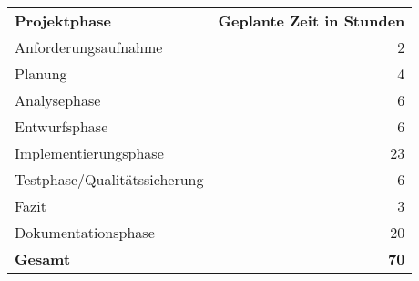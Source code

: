 \begin{tabu}{lr}
	\rowfont{\bfseries\leavevmode\color{headingfont}}\textbf{Projektphase} & \textbf{Geplante Zeit in Stunden} \\
	Anforderungsaufnahme & 2 \\
	Planung & 4 \\
	Analysephase & 6 \\
	Entwurfsphase & 6 \\
	Implementierungsphase & 23 \\
	Testphase/Qualitätssicherung & 6 \\
	Fazit & 3 \\
	Dokumentationsphase & 20 \\
	\hline
	\hline
	\textbf{Gesamt} & \textbf{70} \\
\end{tabu}
